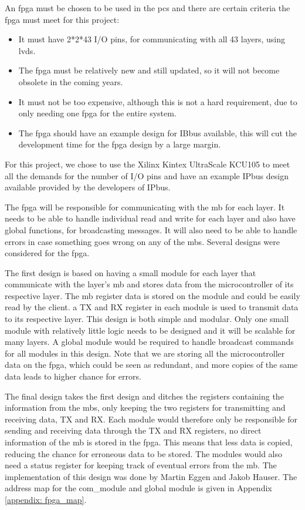 \documentclass[main.tex]{subfiles}
\begin{document}
An \gls{fpga} must be chosen to be used in the \gls{pcs} and there are certain criteria the \gls{fpga} must meet for this project:

\begin{itemize}
    \item It must have 2*2*43 I/O pins, for communicating with all 43 layers, using \acrshort{lvds}.
    \item The \gls{fpga} must be relatively new and still updated, so it will not become obsolete in the coming years.
    \item It must not be too expensive, although this is not a hard requirement, due to only needing one \gls{fpga} for the entire system.
    \item The \gls{fpga} should have an example design for IBbus available, this will cut the development time for the \gls{fpga} design by a large margin.
\end{itemize}

For this project, we chose to use the Xilinx Kintex UltraScale KCU105 to meet all the demands for the number of I/O pins and have an example IPbus design available provided by the developers of IPbus.


The \gls{fpga} will be responsible for communicating with the \gls{mb} for each layer. It needs to be able to handle individual read and write for each layer and also have global functions, for broadcasting messages. It will also need to be able to handle errors in case something goes wrong on any of the \gls{mb}s. Several designs were considered for the \gls{fpga}.

The first design is based on having a small module for each layer that communicate with the layer's \gls{mb} and stores data from the microcontroller of its respective layer. The \gls{mb} register data is stored on the module and could be easily read by the client. a TX and RX register in each module is used to transmit data to its respective layer. This design is both simple and modular. Only one small module with relatively little logic needs to be designed and it will be scalable for many layers. A global module would be required to handle broadcast commands for all modules in this design. Note that we are storing all the microcontroller data on the \gls{fpga}, which could be seen as redundant, and more copies of the same data leads to higher chance for errors.

The final design takes the first design and ditches the registers containing the information from the \gls{mb}s, only keeping the two registers for transmitting and receiving data, TX and RX. Each module would therefore only be responsible for sending and receiving data through the TX and RX registers, no direct information of the \gls{mb} is stored in the \gls{fpga}. This means that less data is copied, reducing the chance for erroneous data to be stored. The modules would also need a status register for keeping track of eventual errors from the \gls{mb}. The implementation of this design was done by Martin Eggen and Jakob Hauser. The address map for the com\_module and global module is given in Appendix \ref{appendix: fpga_map}. 
\end{document}
